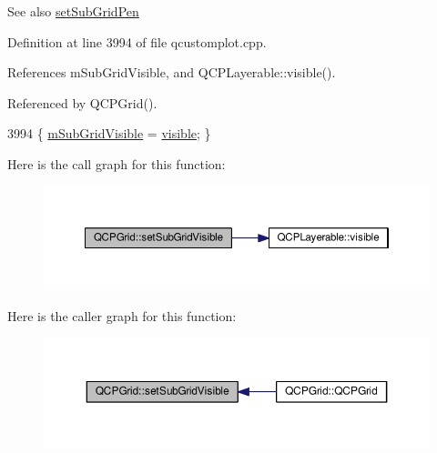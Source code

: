 \begin{DoxySeeAlso}{See also}
\hyperlink{class_q_c_p_grid_a9edd3593f384d1f0b0202a39cef4453d}{set\+Sub\+Grid\+Pen} 
\end{DoxySeeAlso}


Definition at line 3994 of file qcustomplot.\+cpp.



References m\+Sub\+Grid\+Visible, and Q\+C\+P\+Layerable\+::visible().



Referenced by Q\+C\+P\+Grid().


\begin{DoxyCode}
3994 \{ \hyperlink{class_q_c_p_grid_a4e4a0400d6319bb44c06341f6298c87b}{mSubGridVisible} = \hyperlink{class_q_c_p_layerable_a10a3cc92e0fa63e4a929e61d34e275a7}{visible}; \}
\end{DoxyCode}


Here is the call graph for this function\+:\nopagebreak
\begin{figure}[H]
\begin{center}
\leavevmode
\includegraphics[width=350pt]{class_q_c_p_grid_ad4ad6bf714ec45e08845456355a1b700_cgraph}
\end{center}
\end{figure}




Here is the caller graph for this function\+:\nopagebreak
\begin{figure}[H]
\begin{center}
\leavevmode
\includegraphics[width=350pt]{class_q_c_p_grid_ad4ad6bf714ec45e08845456355a1b700_icgraph}
\end{center}
\end{figure}


\hypertarget{class_q_c_p_grid_a209f40fdb252397b418b82d3494d8ea0}{}
